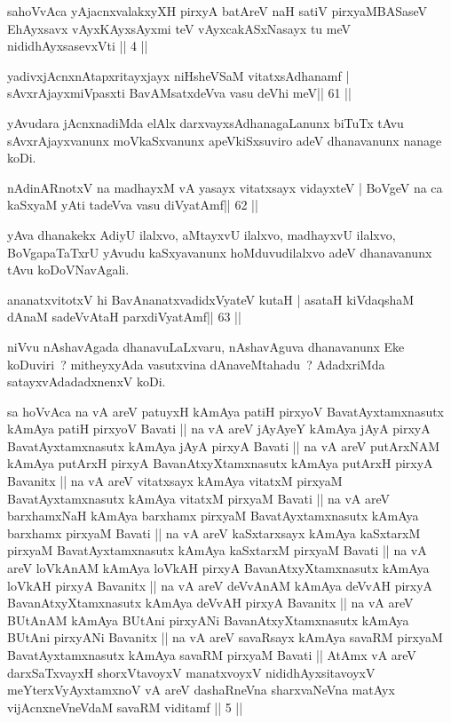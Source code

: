 \begin{kandikeshl}
sahoVvAca yAjacnxvalakxyXH pirxyA batAreV naH satiV pirxyaMBASaseV EhAyxsavx vAyxKAyxsAyxmi teV vAyxcakASxNasayx tu meV nididhAyxsasevxVti || 4 ||
\end{kandikeshl}

\begin{shl}
yadivxjAcnxnAtapxritayxjayx niHsheVSaM vitatxsAdhanamf |
sAvxrAjayxmiVpasxti BavAMsatxdeVva vasu deVhi meV\hfill || 61 ||
\end{shl}

\begin{artha}
yAvudara jAcnxnadiMda elAlx darxvayxsAdhanagaLanunx biTuTx tAvu sAvxrAjayxvanunx moVkaSxvanunx apeVkiSxsuviro adeV dhanavanunx nanage koDi.
\end{artha}

\begin{shl}
nA\s\s dinARnotxV na madhayxM vA yasayx vitatxsayx vidayxteV |
BoVgeV na ca kaSxyaM yAti tadeVva vasu diVyatAmf\hfill || 62 ||
\end{shl}

\begin{artha}
yAva dhanakekx AdiyU ilalxvo, aMtayxvU ilalxvo, madhayxvU ilalxvo, BoVgapaTaTxrU yAvudu kaSxyavanunx hoMduvudilalxvo adeV dhanavanunx tAvu koDoVNavAgali.
\end{artha}

\begin{shl}
ananatxvitotxV hi BavAnanatxvadidxVyateV kutaH |
asataH kiVdaqshaM dAnaM sadeVvAtaH parxdiVyatAmf\hfill || 63 ||
\end{shl}

\begin{artha}
niVvu nAshavAgada dhanavuLaLxvaru, nAshavAguva dhanavanunx Eke koDuviri~? mitheyxyAda vasutxvina dAnaveMtahadu~? AdadxriMda satayxvAdadadxnenxV koDi.
\end{artha}


\begin{kandikeshl}
sa hoVvAca na vA areV patuyxH kAmAya patiH pirxyoV BavatAyxtamxnasutx kAmAya patiH pirxyoV Bavati || na vA areV jAyAyeY kAmAya jAyA pirxyA BavatAyxtamxnasutx kAmAya jAyA pirxyA Bavati || na vA areV putArxNAM kAmAya putArxH pirxyA BavanAtxyXtamxnasutx kAmAya putArxH pirxyA Bavanitx || na vA areV vitatxsayx kAmAya vitatxM pirxyaM BavatAyxtamxnasutx kAmAya vitatxM pirxyaM Bavati || na vA areV barxhamxNaH kAmAya barxhamx pirxyaM BavatAyxtamxnasutx kAmAya barxhamx pirxyaM Bavati || na vA areV kaSxtarxsayx kAmAya kaSxtarxM pirxyaM BavatAyxtamxnasutx kAmAya kaSxtarxM pirxyaM Bavati || na vA areV loVkAnAM kAmAya loVkAH pirxyA BavanAtxyXtamxnasutx kAmAya loVkAH pirxyA Bavanitx || na vA areV deVvAnAM kAmAya deVvAH pirxyA BavanAtxyXtamxnasutx kAmAya deVvAH pirxyA Bavanitx || na vA areV BUtAnAM kAmAya BUtAni pirxyANi BavanAtxyXtamxnasutx kAmAya BUtAni pirxyANi Bavanitx || na vA areV savaRsayx kAmAya savaRM pirxyaM BavatAyxtamxnasutx kAmAya savaRM pirxyaM Bavati || AtAmx vA areV darxSaTxvayxH shorxVtavoyxV manatxvoyxV nididhAyxsitavoyxV meYterxVyAyxtamxnoV vA areV dashaRneVna sharxvaNeVna matAyx vijAcnxneVneVdaM savaRM viditamf || 5 ||
\end{kandikeshl}

